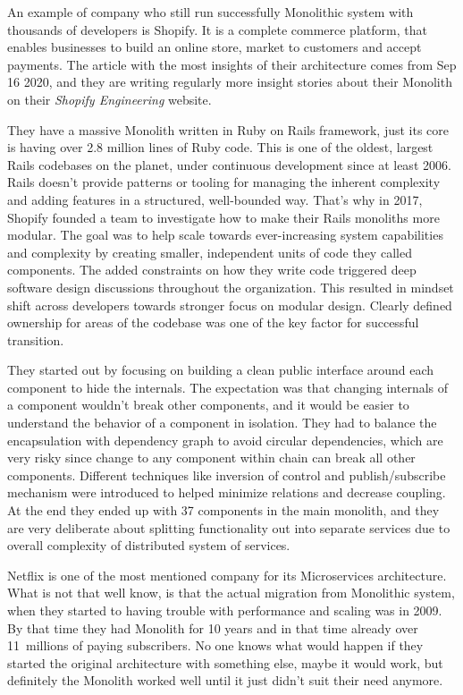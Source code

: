 \begin{example}[Shopify]
    An example of company who still run successfully Monolithic system with thousands of developers is Shopify. It is a complete commerce platform, that enables businesses to build an online store, market to customers and accept payments. The article\cite{SHOPIFY_MONOLITH_ARTICLE} with the most insights of their architecture comes from Sep 16 2020, and they are writing regularly more insight stories about their Monolith on their \textit{Shopify Engineering}\cite{SHOPIFY_ENGINEERING} website.

    They have a massive Monolith written in Ruby on Rails framework, just its core is having over 2.8 million lines of Ruby code. This is one of the oldest, largest Rails codebases on the planet, under continuous development since at least 2006. Rails doesn't provide patterns or tooling for managing the inherent complexity and adding features in a structured, well-bounded way. That's why in 2017, Shopify founded a team to investigate how to make their Rails monoliths more modular. The goal was to help scale towards ever-increasing system capabilities and complexity by creating smaller, independent units of code they called components. The added constraints on how they write code triggered deep software design discussions throughout the organization. This resulted in mindset shift across developers towards stronger focus on modular design. Clearly defined ownership for areas of the codebase was one of the key factor for successful transition. \cite{SHOPIFY_MONOLITH_ARTICLE}

    They started out by focusing on building a clean public interface around each component to hide the internals. The expectation was that changing internals of a component wouldn't break other components, and it would be easier to understand the behavior of a component in isolation. They had to balance the encapsulation with dependency graph to avoid circular dependencies, which are very risky since change to any component within chain can break all other components. Different techniques like inversion of control and publish/subscribe mechanism were introduced to helped minimize relations and decrease coupling. At the end they ended up with 37 components in the main monolith, and they are very deliberate about splitting functionality out into separate services due to overall complexity of distributed system of services. \cite{SHOPIFY_MONOLITH_ARTICLE}
\end{example}

\begin{note*}
    Netflix is one of the most mentioned company for its Microservices architecture. What is not that well know, is that the actual migration from Monolithic system, when they started to having trouble with performance and scaling was in 2009. By that time they had Monolith for 10 years and in that time already over 11~millions \cite{NETFLIX_2009_EARNINGS} of paying subscribers. No one knows what would happen if they started the original architecture with something else, maybe it would work, but definitely the Monolith worked well until it just didn't suit their need anymore.
\end{note*}

